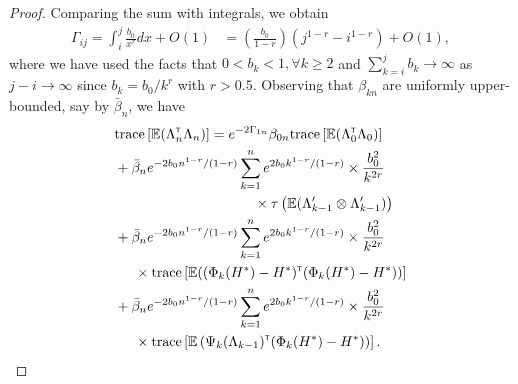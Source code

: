 \begin{proof}
Comparing the sum with integrals, we obtain
\begin{align*}
\Gamma_{ij} = \int_i^j \frac{b_0}{x^r} dx + O(1) &= \left(\frac{b_0}{1-r}\right)(j^{1-r}-i^{1-r}) +O(1),
\end{align*}
where we have used the facts that $0 < b_k < 1, \forall k \ge 2$ and 
$\sum_{k=i}^j b_k \to \infty$ as $j-i \to \infty$ since 
$b_k = b_0/k^r$ with $r > 0.5$.
Observing that $\beta_{kn}$ are uniformly upper-bounded, say by $\bar \beta_n$, we have
\begin{align}\label{eq:thmwts}
 & \text{trace} \left[\E (\Lambda_n \tr \Lambda_n)\right] =  e^{-2 \Gamma_{1n}} \beta_{0n} \text{trace} \left[\E (\Lambda_0 \tr \Lambda_0)\right]  \nonumber\\ 
&+ \bar \beta_n e^{-2 b_0 n^{1-r}/(1-r)} \sum_{k=1}^n e^{2 b_0 k^{1-r}/(1-r)}  \times \frac{b_0^2}{k^{2 r}} \nonumber\\
& \hspace{3.5cm} \times \tau\left(\E (\Lambda_{k-1}' \otimes \Lambda_{k-1}')\right)  \nonumber\\ 
&+ \bar \beta_n e^{-2 b_0 n^{1-r}/(1-r)} \sum_{k=1}^n e^{2 b_0 k^{1-r}/(1-r)}  \times \frac{b_0^2}{k^{2 r}}  \nonumber\\
&  \hspace{0.5cm}\times \text{trace}\left[\E ((\Phi_k(H^*) - H^*) \tr  (\Phi_k(H^*) - H^*))\right] \nonumber\\ &+ \bar \beta_n e^{-2 b_0 n^{1-r}/(1-r)} \sum_{k=1}^n e^{2 b_0 k^{1-r}/(1-r)}  \times \frac{b_0^2}{k^{2 r}}  \nonumber\\& \hspace{0.5cm} \times \text{trace} \left[\E\left(\Psi_k(\Lambda_{k-1}) \tr (\Phi_k(H^*) - H^*)\right)\right].
\end{align} 
%


\end{proof}
